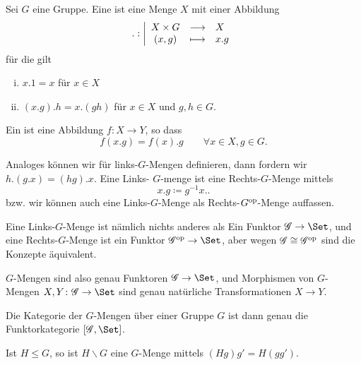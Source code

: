 \begin{definition}[$G$-Menge]\label{def:g-menge}
    Sei $G$ eine Gruppe. Eine  ist eine Menge  $X$ mit einer Abbildung
        \begin{equation*}
        .: \left| \begin{array}{c c l} 
        X\times G & \longrightarrow & X \\
        (x,g) & \longmapsto &  x.g
        \end{array} \right.
    \end{equation*}
    für die gilt
    \begin{enumerate}[i)]
        \item $x.1 = x$ für  $x\in X$
        \item $(x.g).h = x.(gh)$ für  $x\in X$ und $g,h\in G$.
    \end{enumerate}
    Ein  ist eine Abbildung $f\colon X \to  Y$, so dass
\[
    f(x.g) = f(x).g \qquad \forall x\in X, g\in G
.\] 
\end{definition}

\begin{remark}
    Analoges können wir für links-$G$-Mengen definieren, dann fordern wir  $h.(g.x) = (hg).x$. Eine Links- $G$-menge ist eine Rechts-$G$-Menge mittels
     \[
    x.g \coloneqq g^{-1}x.
    .\] 
    bzw. wir können auch eine Links-$G$-Menge als Rechts-$G^{\textrm{op}}$-Menge auffassen.

Eine Links-$G$-Menge ist nämlich nichts anderes als Ein Funktor  $\cat{G} \to  \Set$, und eine Rechts-$G$-Menge ist ein Funktor  $\cat{G}^{\op} \to  \Set$, aber wegen $\mathscr{G} \cong \mathscr{G}^{\textrm{op}}$ sind die Konzepte äquivalent.
\end{remark}

\begin{trivial}
    $G$-Mengen sind also genau Funktoren  $\cat{G} \to  \Set$, und Morphismen von $G$-Mengen  $X,Y \colon  \cat{G} \to  \Set$ sind genau natürliche Transformationen $X \to Y$.

    Die Kategorie der $G$-Mengen über einer Gruppe  $G$ ist dann genau die Funktorkategorie  $[\cat{G},\Set]$.
\end{trivial}

\begin{example}
    Ist $H\leq G$, so ist $H \backslash G$ eine  $G$-Menge mittels  $(Hg)g' = H(gg')$.
\end{example}

